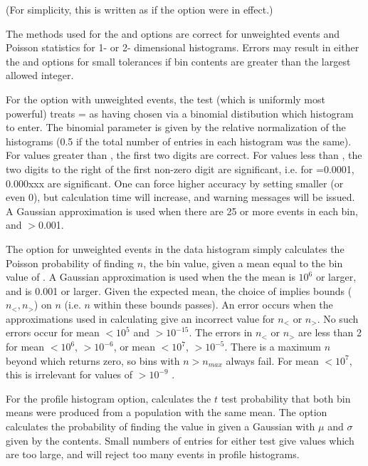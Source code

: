 (For simplicity, this is written as if the  option were in effect.)

The methods used for the  and  options are correct for
unweighted events and Poisson statistics for 1- or 2- dimensional histograms.  
Errors may result in either the  and  options for small 
tolerances if bin contents are greater than the largest allowed integer.

For the  option with unweighted events, the test (which is
uniformly most powerful) treats  =  
as having chosen via a binomial distibution which histogram to enter.  
The binomial parameter  is given by the relative normalization of the
histograms (0.5 if the total number of entries in each histogram was the same). 
For  values greater than , the first two digits are correct. 
For values less than , the two digits to the right of the first 
non-zero  digit are significant,
i.e. for \mbox{=0.0001}, 0.000xxx are significant.  
One can force higher accuracy by setting  smaller (or even 0), 
but calculation time will increase, and warning messages will be issued.  
A Gaussian approximation is used when there are 25 or more events in each bin, 
and \mbox{$>$0.001}.

The  option for unweighted events in the data histogram simply 
calculates the Poisson probability of finding $n$, the  bin value,  
given a mean equal to the bin value of . 
A Gaussian approximation is used when the the mean is $10^{6}$ or larger, 
and  is 0.001 or larger.  
Given the expected mean, the choice of  implies bounds 
($n_{<},n_{>}$) on $n$ (i.e. $n$ within these bounds passes).  
An error occurs when the approximations used in calculating 
 give an incorrect value for $n_{<}$ or $n_{>}$.  
No such errors occur for mean $<10^{5}$ and  $>10^{-15}$.
The errors in $n_{<}$ or $n_{>}$ are less than 2 for mean $<10^{6}$,
 $>10^{-6}$, or
    mean $<10^{7}$,  $>10^{-5}$.  
There is a maximum $n$ beyond which 
returns zero, so bins with $n > n_{max}$ always fail.  For mean $<10^{7}$,
this is irrelevant for values of  $>10^{-9}$ .

For the profile histogram  option,  calculates
the $t$ test probability that both bin means were produced from a population 
with the same mean.  
The  option calculates the probability of finding the
value in  given a Gaussian with $\mu$ and $\sigma$ given by the
 contents.
Small numbers of entries for either test give  values which are
too large, and  will reject too many events in profile histograms.

